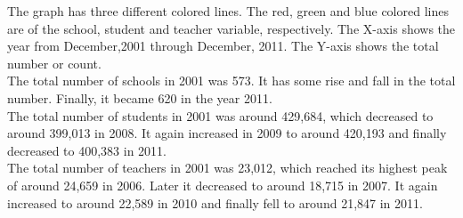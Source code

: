 \documentclass{article}\usepackage[]{graphicx}\usepackage[]{color}
\begin{document}
The graph has three different colored lines. The red, green and blue colored lines are of the school, student and teacher variable, respectively. The X-axis shows the year from December,2001 through December, 2011. The Y-axis shows the total number or count.
\\ The total number of schools in 2001 was 573. It has some rise and fall in the total number. Finally, it became 620 in the year 2011.
\\ The total number of students in 2001 was around 429,684, which decreased to around 399,013 in 2008. It again increased in 2009 to around 420,193 and finally decreased to 400,383 in 2011.
\\ The total number of teachers in 2001 was 23,012, which reached its highest peak of around 24,659 in 2006. Later it decreased to around 18,715 in 2007. It again increased to around 22,589 in 2010 and finally fell to around 21,847 in 2011.
\end{document}
